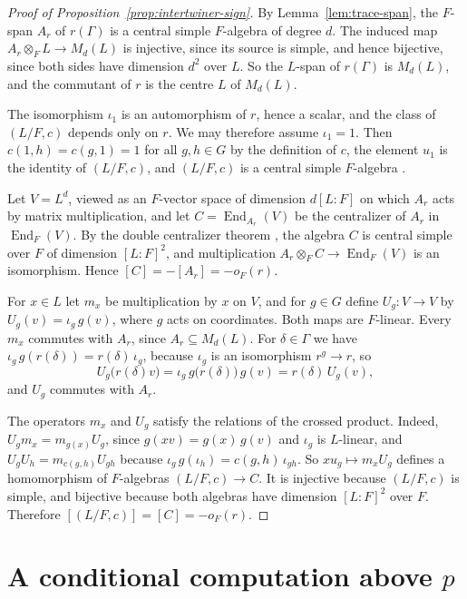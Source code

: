 \documentclass[a4paper,11pt]{amsart}
\theoremstyle{definition}
\theoremstyle{remark}
\numberwithin{equation}{section}
\DeclareMathOperator{\End}{End}
\begin{document}
\begin{proof}[Proof of Proposition~\ref{prop:intertwiner-sign}]
By Lemma~\ref{lem:trace-span}, the $F$-span $A_r$ of $r(\Gamma)$ is a central simple $F$-algebra of degree $d$. The induced map $A_r\otimes_FL\to M_d(L)$ is injective, since its source is simple, and hence bijective, since both sides have dimension $d^2$ over $L$. So the $L$-span of $r(\Gamma)$ is $M_d(L)$, and the commutant of $r$ is the centre $L$ of $M_d(L)$.

The isomorphism $\iota_1$ is an automorphism of $r$, hence a scalar, and the class of $(L/F,c)$ depends only on $r$. We may therefore assume $\iota_1=1$. Then $c(1,h)=c(g,1)=1$ for all $g,h\in G$ by the definition of $c$, the element $u_1$ is the identity of $(L/F,c)$, and $(L/F,c)$ is a central simple $F$-algebra \cite[IV, Lemma~3.13]{Mil20}.

Let $V=L^d$, viewed as an $F$-vector space of dimension $d[L:F]$ on which $A_r$ acts by matrix multiplication, and let $C=\End_{A_r}(V)$ be the centralizer of $A_r$ in $\End_F(V)$. By the double centralizer theorem \cite[IV, Theorem~3.1 and Corollary~3.3]{Mil20}, the algebra $C$ is central simple over $F$ of dimension $[L:F]^2$, and multiplication $A_r\otimes_FC\to\End_F(V)$ is an isomorphism. Hence $[C]=-[A_r]=-o_F(r)$.

For $x\in L$ let $m_x$ be multiplication by $x$ on $V$, and for $g\in G$ define $U_g\colon V\to V$ by $U_g(v)=\iota_g\,g(v)$, where $g$ acts on coordinates. Both maps are $F$-linear. Every $m_x$ commutes with $A_r$, since $A_r\subseteq M_d(L)$. For $\delta\in\Gamma$ we have $\iota_g\,g(r(\delta))=r(\delta)\,\iota_g$, because $\iota_g$ is an isomorphism $r^g\to r$, so
\[
 U_g\bigl(r(\delta)v\bigr)=\iota_g\,g\bigl(r(\delta)\bigr)\,g(v)=r(\delta)\,U_g(v),
\]
and $U_g$ commutes with $A_r$.

The operators $m_x$ and $U_g$ satisfy the relations of the crossed product. Indeed, $U_gm_x=m_{g(x)}U_g$, since $g(xv)=g(x)\,g(v)$ and $\iota_g$ is $L$-linear, and $U_gU_h=m_{c(g,h)}U_{gh}$ because $\iota_g\,g(\iota_h)=c(g,h)\,\iota_{gh}$. So $xu_g\mapsto m_xU_g$ defines a homomorphism of $F$-algebras $(L/F,c)\to C$. It is injective because $(L/F,c)$ is simple, and bijective because both algebras have dimension $[L:F]^2$ over $F$. Therefore $[(L/F,c)]=[C]=-o_F(r)$.
\end{proof}

\section{A conditional computation above \texorpdfstring{$p$}{p}}
\label{app:isocrystal}
\end{document}
